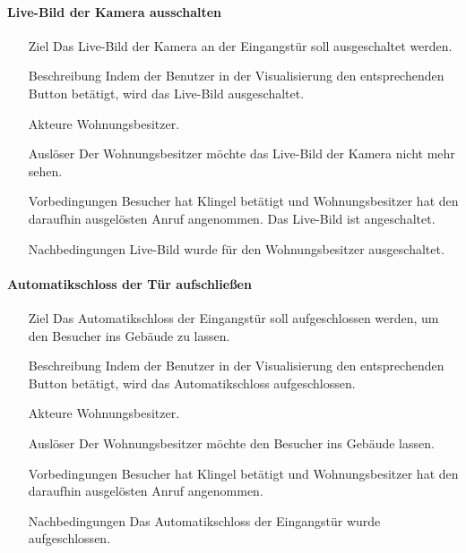 \paragraph{Live-Bild der Kamera ausschalten}
    \begin{itemize}
        \item[Ziel]
        Das Live-Bild der Kamera an der Eingangstür soll ausgeschaltet werden.
        \item[Beschreibung]
        Indem der Benutzer in der Visualisierung den entsprechenden Button betätigt, wird das Live-Bild ausgeschaltet.
        \item[Akteure]
        Wohnungsbesitzer.
        \item[Auslöser]
        Der Wohnungsbesitzer möchte das Live-Bild der Kamera nicht mehr sehen.
        \item[Vorbedingungen]
        Besucher hat Klingel betätigt und Wohnungsbesitzer hat den daraufhin ausgelösten Anruf angenommen.
        Das Live-Bild ist angeschaltet.
        \item[Nachbedingungen]
        Live-Bild wurde für den Wohnungsbesitzer ausgeschaltet.
        \end{itemize}

\paragraph{Automatikschloss der Tür aufschließen}
    \begin{itemize}
        \item[Ziel]
        Das Automatikschloss der Eingangstür soll aufgeschlossen werden, um den Besucher ins Gebäude zu lassen.
        \item[Beschreibung]
        Indem der Benutzer in der Visualisierung den entsprechenden Button betätigt, wird das Automatikschloss aufgeschlossen.
        \item[Akteure]
        Wohnungsbesitzer.
        \item[Auslöser]
        Der Wohnungsbesitzer möchte den Besucher ins Gebäude lassen.
        \item[Vorbedingungen]
        Besucher hat Klingel betätigt und Wohnungsbesitzer hat den daraufhin ausgelösten Anruf angenommen.
        \item[Nachbedingungen]
        Das Automatikschloss der Eingangstür wurde aufgeschlossen.
        \end{itemize}


